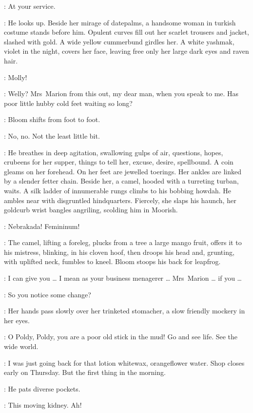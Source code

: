 \Bloom:
At your service.

:
He looks up.
Beside her mirage of datepalms,
a handsome woman in turkish costume stands before him.
Opulent curves fill out her scarlet trousers and jacket,
slashed with gold.
A wide yellow cummerbund girdles her.
A white yashmak,
violet in the night,
covers her face,
leaving free only her large dark eyes and raven hair.

\Bloom:
Molly!

\Marion[1]:
Welly?
Mrs~Marion from this out,
my dear man,
when you speak to me.
Has poor little hubby cold feet waiting so long?

:
Bloom shifts from foot to foot.

\Bloom:
No,
no.
Not the least little bit.

:
He breathes in deep agitation,
swallowing gulps of air,
questions,
hopes,
cru\-beens for her supper,
things to tell her,
excuse,
desire,
spellbound.
A coin gleams on her forehead.
On her feet are jewelled toerings.
Her ankles are linked by a slender fetter chain.
Beside her,
a camel,
hooded with a turreting turban,
waits.
A silk ladder of innumerable rungs climbs to his bobbing howdah.
He ambles near with disgruntled hindquarters.
Fiercely,
she slaps his haunch,
her goldcurb wrist bangles angriling,
scolding him in Moorish.

\Marion:
Nebrakada!
Femininum!

:
The camel,
lifting a foreleg,
plucks from a tree a large mango fruit,
offers it to his mistress,
blinking,
in his cloven hoof,
then droops his head and,
grunting,
with uplifted neck,
fumbles to kneel.
Bloom stoops his back for leapfrog.

\Bloom:
I can give you \ldots
I mean as your business menagerer \ldots
Mrs~Marion \ldots
if you \ldots

\Marion:
So you notice some change?

:
Her hands pass slowly over her trinketed stomacher,
a slow friendly mockery in her eyes.

\Marion:
O Poldy,
Poldy,
you are a poor old stick in the mud!
Go and see life.
See the wide world.

\Bloom:
I was just going back for that lotion whitewax,
orangeflower water.
Shop closes early on Thursday.
But the first thing in the morning.

:
He pats diverse pockets.

\Bloom:
This moving kidney.
Ah!


